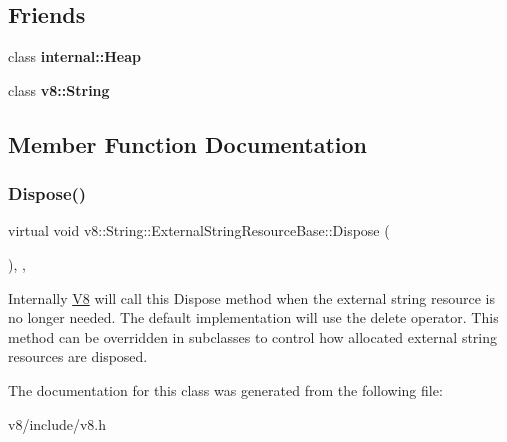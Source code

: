 \subsection*{Friends}
\begin{DoxyCompactItemize}
\item 
\mbox{\label{classv8_1_1String_1_1ExternalStringResourceBase_a20a566310503e50c1b32668c772a14b2}} 
class {\bfseries internal\+::\+Heap}
\item 
\mbox{\label{classv8_1_1String_1_1ExternalStringResourceBase_a74072e7f09bdb13330b20ba10dcb8b55}} 
class {\bfseries v8\+::\+String}
\end{DoxyCompactItemize}


\subsection{Member Function Documentation}
\mbox{\label{classv8_1_1String_1_1ExternalStringResourceBase_af4720342ae31e1ab4656df3f15d069c0}} 
\subsubsection{\texorpdfstring{Dispose()}{Dispose()}}
{\footnotesize\ttfamily virtual void v8\+::\+String\+::\+External\+String\+Resource\+Base\+::\+Dispose (\begin{DoxyParamCaption}{ }\end{DoxyParamCaption})\hspace{0.3cm}{\ttfamily [inline]}, {\ttfamily [protected]}, {\ttfamily [virtual]}}

Internally \mbox{\hyperlink{classv8_1_1V8}{V8}} will call this Dispose method when the external string resource is no longer needed. The default implementation will use the delete operator. This method can be overridden in subclasses to control how allocated external string resources are disposed. 

The documentation for this class was generated from the following file\+:\begin{DoxyCompactItemize}
\item 
v8/include/v8.\+h\end{DoxyCompactItemize}
